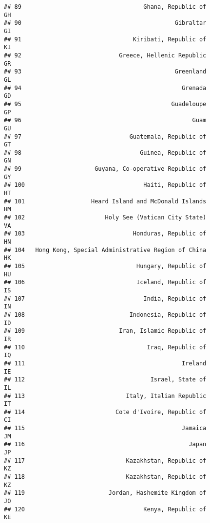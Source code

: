 \documentclass[
]{article}
\begin{document}
\begin{verbatim}
## 89                                   Ghana, Republic of                      GH
## 90                                            Gibraltar                      GI
## 91                                Kiribati, Republic of                      KI
## 92                            Greece, Hellenic Republic                      GR
## 93                                            Greenland                      GL
## 94                                              Grenada                      GD
## 95                                           Guadeloupe                      GP
## 96                                                 Guam                      GU
## 97                               Guatemala, Republic of                      GT
## 98                                  Guinea, Republic of                      GN
## 99                     Guyana, Co-operative Republic of                      GY
## 100                                  Haiti, Republic of                      HT
## 101                   Heard Island and McDonald Islands                      HM
## 102                       Holy See (Vatican City State)                      VA
## 103                               Honduras, Republic of                      HN
## 104   Hong Kong, Special Administrative Region of China                      HK
## 105                                Hungary, Republic of                      HU
## 106                                Iceland, Republic of                      IS
## 107                                  India, Republic of                      IN
## 108                              Indonesia, Republic of                      ID
## 109                           Iran, Islamic Republic of                      IR
## 110                                   Iraq, Republic of                      IQ
## 111                                             Ireland                      IE
## 112                                    Israel, State of                      IL
## 113                             Italy, Italian Republic                      IT
## 114                          Cote d'Ivoire, Republic of                      CI
## 115                                             Jamaica                      JM
## 116                                               Japan                      JP
## 117                             Kazakhstan, Republic of                      KZ
## 118                             Kazakhstan, Republic of                      KZ
## 119                        Jordan, Hashemite Kingdom of                      JO
## 120                                  Kenya, Republic of                      KE

\end{verbatim}
\end{document}
